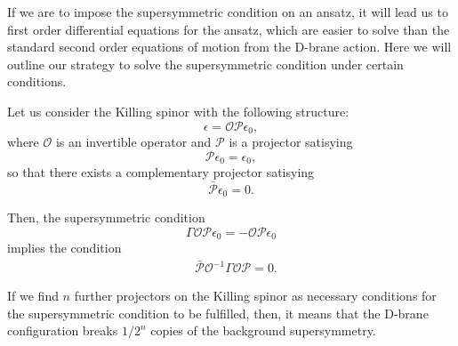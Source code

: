 If we are to impose the supersymmetric condition on an ansatz, it will lead us to first order differential equations for the ansatz, which are easier to solve than the standard second order equations of motion from the D-brane action. Here we will outline our strategy to solve the supersymmetric condition under certain conditions.

Let us consider the Killing spinor with the following structure:
\begin{equation}
\epsilon = \mathcal{O} \mathcal{P} \epsilon_0,
\end{equation}
where $\mathcal{O}$ is an invertible operator and $\mathcal{P}$ is a projector satisying
\begin{equation}
    \mathcal{P} \epsilon_0 =  \epsilon_0,
\end{equation}
so that there exists a complementary projector satisying
\begin{equation}
    \bar{\mathcal{P}} \epsilon_0 =  0.
\end{equation}

Then, the supersymmetric condition
\begin{equation}
 \Gamma \mathcal{O} \mathcal{P} \epsilon_0 = - \mathcal{O} \mathcal{P} \epsilon_0
\end{equation}
implies the condition
\begin{align}\label{eq:susyCondition0}
&\bar{\mathcal{P}} \mathcal{O}^{-1} \Gamma \mathcal{O} \mathcal{P}  = 0.
\end{align}


If we find $n$ further projectors on the Killing spinor as necessary conditions for the supersymmetric condition to be fulfilled, then, it means that the D-brane configuration breaks $1/2^n$ copies of the background supersymmetry. 
























